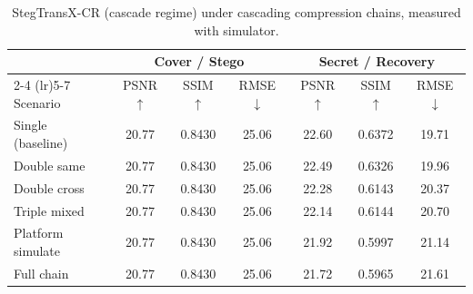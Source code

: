 \begin{table}[t]
\centering
\caption{StegTransX-CR (cascade regime) under cascading compression chains, measured with simulator.}
\label{tab:cascade-cascade-sim}
\begin{tabular}{lcccccc}
\toprule
& \multicolumn{3}{c}{Cover / Stego} & \multicolumn{3}{c}{Secret / Recovery} \\
\cmidrule(lr){2-4} \cmidrule(lr){5-7}
Scenario & PSNR $\uparrow$ & SSIM $\uparrow$ & RMSE $\downarrow$ & PSNR $\uparrow$ & SSIM $\uparrow$ & RMSE $\downarrow$ \\
\midrule
Single (baseline) & 20.77 & 0.8430 & 25.06 & 22.60 & 0.6372 & 19.71 \\
Double same & 20.77 & 0.8430 & 25.06 & 22.49 & 0.6326 & 19.96 \\
Double cross & 20.77 & 0.8430 & 25.06 & 22.28 & 0.6143 & 20.37 \\
Triple mixed & 20.77 & 0.8430 & 25.06 & 22.14 & 0.6144 & 20.70 \\
Platform simulate & 20.77 & 0.8430 & 25.06 & 21.92 & 0.5997 & 21.14 \\
Full chain & 20.77 & 0.8430 & 25.06 & 21.72 & 0.5965 & 21.61 \\
\bottomrule
\end{tabular}
\end{table}
